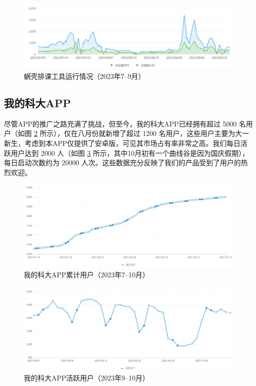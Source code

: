 \begin{figure}[htbp]
  \centering
  \includegraphics[width=\columnwidth]{figure/3.jpg}
  \caption{蜗壳排课工具运行情况（2023年7--9月）}
  \label{fig:3}
\end{figure}

\subsection{我的科大APP}

尽管APP的推广之路充满了挑战，但至今，我的科大APP已经拥有超过 5000 名用户（如图 \ref{fig:4} 所示），仅在八月份就新增了超过 1200 名用户，这些用户主要为大一新生，考虑到本APP仅提供了安卓版，可见其市场占有率非常之高。我们每日活跃用户达到 2000 人（如图 \ref{fig:5} 所示，其中10月初有一个曲线谷是因为国庆假期），每日启动次数约为 20000 人次。这些数据充分反映了我们的产品受到了用户的热烈欢迎。

\begin{figure}[htbp]
  \centering
  \includegraphics[width=\columnwidth]{figure/4.jpg}
  \caption{我的科大APP累计用户（2023年7--10月）}
  \label{fig:4}
\end{figure}

\begin{figure}[htbp]
  \centering
  \includegraphics[width=\columnwidth]{figure/5.jpg}
  \caption{我的科大APP活跃用户（2023年9--10月）}
  \label{fig:5}
\end{figure}